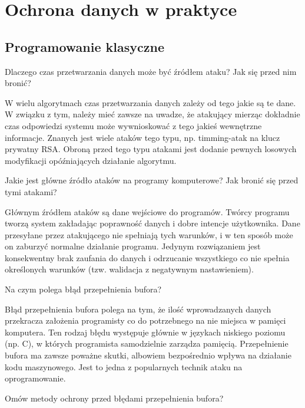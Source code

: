 \documentclass[answers,11pt]{exam}
\begin{document}
\section{Ochrona danych w praktyce}

\subsection{Programowanie klasyczne}
\begin{questions}

\question Dlaczego czas przetwarzania danych może być źródłem ataku? Jak się przed nim bronić?
\begin{solution}
W wielu algorytmach czas przetwarzania danych zależy od tego jakie są te dane. W związku z tym, należy mieć zawsze na uwadze, że atakujący mierząc dokładnie czas odpowiedzi systemu może wywnioskować z tego jakieś wewnętrzne informacje. Znanych jest wiele ataków tego typu, np. timming-atak na klucz prywatny RSA.
Obroną przed tego typu atakami jest dodanie pewnych losowych modyfikacji opóźniających działanie algorytmu.  
\end{solution}

\question Jakie jest główne źródło ataków na programy komputerowe? Jak bronić się przed tymi atakami?
\begin{solution}
Głównym źródłem ataków są dane wejściowe do programów. Twórcy programu tworzą system zakładając poprawność danych i dobre intencje użytkownika. Dane przesyłane przez atakującego nie spełniają tych warunków, i w ten sposób może on zaburzyć normalne działanie programu. 
Jedynym rozwiązaniem jest konsekwentny brak zaufania do danych i odrzucanie wszystkiego co nie spełnia określonych warunków (tzw. walidacja z negatywnym nastawieniem).
\end{solution}


\question Na czym polega błąd przepełnienia bufora?
\begin{solution}
Błąd przepełnienia bufora polega na tym, że ilość wprowadzanych danych przekracza założenia programisty co do potrzebnego na nie miejsca w pamięci komputera. Ten rodzaj błędu występuje głównie w językach niskiego poziomu (np. C), w których programista samodzielnie zarządza pamięcią. Przepełnienie bufora ma zawsze poważne skutki, albowiem bezpośrednio wpływa na działanie kodu maszynowego. Jest to jedna z popularnych technik ataku na oprogramowanie. 
\end{solution}

\question Omów metody ochrony przed błędami przepełnienia bufora?


\end{questions}
\end{document}

